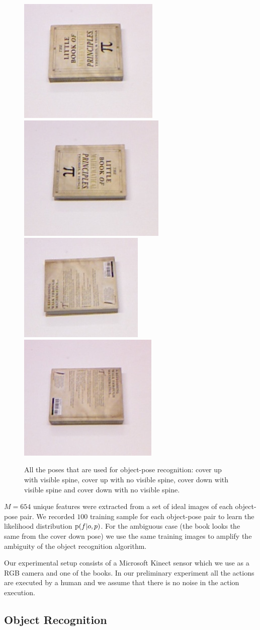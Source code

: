     
     \begin{figure}
     \centering
    		\includegraphics[width = 0.2\columnwidth]{pics/math_cover1.jpg}
    		\includegraphics[width = 0.2\columnwidth]{pics/math_cover1_rot.jpg}
    		\includegraphics[width = 0.2\columnwidth]{pics/math_down.jpg}
    		\includegraphics[width = 0.2\columnwidth]{pics/math_down_rot.jpg}
    		\caption{All the poses that are used for object-pose recognition: cover up with visible spine, cover up with no visible spine, cover down with visible spine and cover down with no visible spine.}
	\label{fig:pose_dataset}
    \end{figure}       
    
    
$M = 654$ unique features were extracted from a set of ideal images of each object-pose pair. We recorded $100$ training sample for each object-pose pair to learn the likelihood distribution $\text{p}(f|o,p)$. For the ambiguous case (the book looks the same from the cover down pose) we use the same training images to amplify the ambiguity of the object recognition algorithm.

    Our experimental setup consists of a Microsoft Kinect sensor which we use as a RGB camera and one of the books. In our preliminary experiment all the actions are executed by a human and we assume that there is no noise in the action execution. 

    \subsection{Object Recognition}
    

